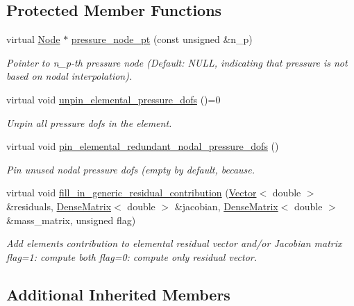 \subsection*{Protected Member Functions}
\begin{DoxyCompactItemize}
\item 
virtual \hyperlink{classoomph_1_1Node}{Node} $\ast$ \hyperlink{classoomph_1_1RefineablePolarNavierStokesEquations_a83ec74f6d0ecc0b120149a1dad682486}{pressure\+\_\+node\+\_\+pt} (const unsigned \&n\+\_\+p)
\begin{DoxyCompactList}\small\item\em Pointer to n\+\_\+p-\/th pressure node (Default\+: N\+U\+LL, indicating that pressure is not based on nodal interpolation). \end{DoxyCompactList}\item 
virtual void \hyperlink{classoomph_1_1RefineablePolarNavierStokesEquations_add592ab49fc813016f9d0d22bc82a68f}{unpin\+\_\+elemental\+\_\+pressure\+\_\+dofs} ()=0
\begin{DoxyCompactList}\small\item\em Unpin all pressure dofs in the element. \end{DoxyCompactList}\item 
virtual void \hyperlink{classoomph_1_1RefineablePolarNavierStokesEquations_a29a784c096caf88d102b8fd13dc686e6}{pin\+\_\+elemental\+\_\+redundant\+\_\+nodal\+\_\+pressure\+\_\+dofs} ()
\begin{DoxyCompactList}\small\item\em Pin unused nodal pressure dofs (empty by default, because. \end{DoxyCompactList}\item 
virtual void \hyperlink{classoomph_1_1RefineablePolarNavierStokesEquations_a57ee96ad52906cc81b27676a1cc9fb25}{fill\+\_\+in\+\_\+generic\+\_\+residual\+\_\+contribution} (\hyperlink{classoomph_1_1Vector}{Vector}$<$ double $>$ \&residuals, \hyperlink{classoomph_1_1DenseMatrix}{Dense\+Matrix}$<$ double $>$ \&jacobian, \hyperlink{classoomph_1_1DenseMatrix}{Dense\+Matrix}$<$ double $>$ \&mass\+\_\+matrix, unsigned flag)
\begin{DoxyCompactList}\small\item\em Add element\textquotesingle{}s contribution to elemental residual vector and/or Jacobian matrix flag=1\+: compute both flag=0\+: compute only residual vector. \end{DoxyCompactList}\end{DoxyCompactItemize}
\subsection*{Additional Inherited Members}


